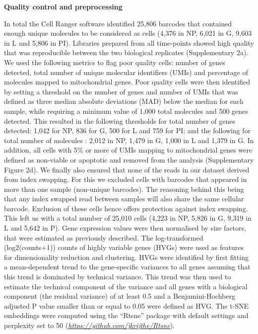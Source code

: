 \documentclass[titlepage, 12pt, oneside]{amsart}
\begin{document}
\textbf{Quality control and preprocessing}

In total the Cell Ranger software identified 25,806 barcodes that contained enough unique molecules to be considered as cells (4,376 in NP, 6,021 in G, 9,603 in L and 5,806 in PI).
Libraries prepared from all time-points showed high quality that was reproducible between the two biological replicates (Supplementary 2a).
We used the following metrics to flag poor quality cells: number of genes detected, total number of unique molecular identifiers (UMIs) and percentage of molecules mapped to mitochondrial genes.
Poor quality cells were then identified by setting a threshold on the number of genes and number of UMIs that was defined as three median absolute deviations (MAD) below the median for each sample, while requiring a minimum value of 1,000 total molecules and 500 genes detected.  
This resulted in the following thresholds for total number of genes detected: 1,042 for NP, 836 for G, 500 for L and 759 for PI; and the following for total number of molecules : 2,012 in NP, 1,479 in G, 1,000 in L and 1,379 in G.
In addition, all cells with 5\% or more of UMIs mapping to mitochondrial genes were defined as non-viable or apoptotic and removed from the analysis (Supplementary Figure 2d).
We finally also ensured that none of the reads in our dataset derived from index swapping\autocite{Sinha2017, Griffiths2017}.
For this we excluded cells with barcodes that appeared in more than one sample (non-unique barcodes).
The reasoning behind this being that any index swapped read between samples will also share the same cellular barcode.
Exclusion of these cells hence offers protection against index swapping.
This left us with a total number of 25,010 cells (4,223 in NP, 5,826 in G, 9,319 in L and 5,642 in P).
Gene expression values were then normalised by size factors, that were estimated as previously described\autocite{Lun2016}.
The log-transformed (log2(counts+1)) counts of highly variable genes (HVGs) were used as features for dimensionality reduction and clustering.
HVGs were identified by first fitting a mean-dependent trend to the gene-specific variances to all genes assuming that this trend is dominated by technical variance.
This trend was then used to estimate the technical component of the variance and all genes with a biological component (the residual variance) of at least 0.5 and a Benjamini-Hochberg adjusted P value smaller than or equal to 0.05 were defined as HVG.
The t-SNE embeddings were computed using the ``Rtsne'' package with default settings and perplexity set to 50 (\href{https://github.com/jkrijthe/Rtsne}{\textit{https://github.com/jkrijthe/Rtsne}}).
\end{document}
